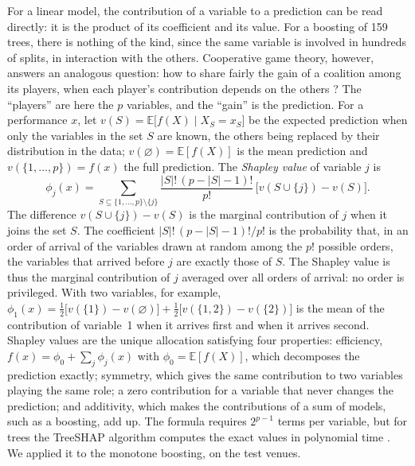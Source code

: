 \documentclass[11pt,a4paper]{article}
\newcommand{\E}{\mathbb{E}}
\begin{document}
For a linear model, the contribution of a variable to a prediction can be read directly: it is the product of its
coefficient and its value. For a boosting of 159 trees, there is nothing of the kind, since the same variable is
involved in hundreds of splits, in interaction with the others. Cooperative game theory, however, answers an analogous
question: how to share fairly the gain of a coalition among its players, when each player's contribution depends on
the others \citep{shapley1953}? The ``players'' are here the $p$ variables, and the ``gain'' is the prediction. For a
performance $x$, let $v(S) = \E\big[f(X) \mid X_S = x_S\big]$ be the expected prediction when only the variables in
the set $S$ are known, the others being replaced by their distribution in the data; $v(\varnothing) = \E[f(X)]$ is the
mean prediction and $v(\{1, \dots, p\}) = f(x)$ the full prediction. The \emph{Shapley value} of variable $j$ is
\begin{equation}\label{eq:shapley}
\phi_j(x) = \sum_{S \subseteq \{1, \dots, p\} \setminus \{j\}} \frac{|S|!\,(p - |S| - 1)!}{p!}\,
\big[v(S \cup \{j\}) - v(S)\big].
\end{equation}
The difference $v(S \cup \{j\}) - v(S)$ is the marginal contribution of $j$ when it joins the set $S$. The coefficient
$|S|!\,(p - |S| - 1)!/p!$ is the probability that, in an order of arrival of the variables drawn at random among the
$p!$ possible orders, the variables that arrived before $j$ are exactly those of $S$. The Shapley value is thus the
marginal contribution of $j$ averaged over all orders of arrival: no order is privileged. With two variables, for
example, $\phi_1(x) = \frac12\big[v(\{1\}) - v(\varnothing)\big] + \frac12\big[v(\{1, 2\}) - v(\{2\})\big]$ is the mean
of the contribution of variable~1 when it arrives first and when it arrives second. Shapley values are the unique
allocation satisfying four properties: efficiency, $f(x) = \phi_0 + \sum_{j} \phi_j(x)$ with $\phi_0 = \E[f(X)]$, which
decomposes the prediction exactly; symmetry, which gives the same contribution to two variables playing the same role;
a zero contribution for a variable that never changes the prediction; and additivity, which makes the contributions of
a sum of models, such as a boosting, add up. The formula requires $2^{p-1}$ terms per variable, but for trees the
TreeSHAP algorithm computes the exact values in polynomial time \citep{lundberg2017, lundberg2020}. We applied it to
the monotone boosting, on the test venues.
\end{document}
